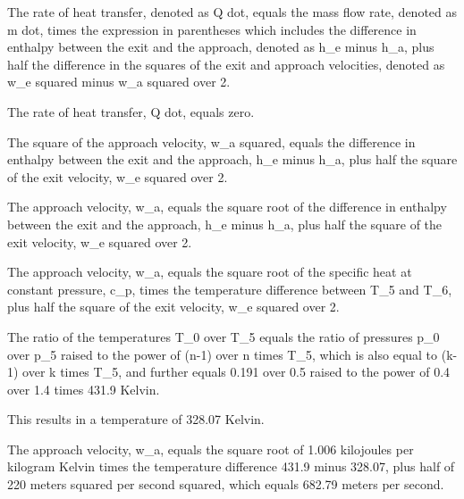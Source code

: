 The rate of heat transfer, denoted as Q dot, equals the mass flow rate, denoted as m dot, times the expression in parentheses which includes the difference in enthalpy between the exit and the approach, denoted as h_e minus h_a, plus half the difference in the squares of the exit and approach velocities, denoted as w_e squared minus w_a squared over 2.

The rate of heat transfer, Q dot, equals zero.

The square of the approach velocity, w_a squared, equals the difference in enthalpy between the exit and the approach, h_e minus h_a, plus half the square of the exit velocity, w_e squared over 2.

The approach velocity, w_a, equals the square root of the difference in enthalpy between the exit and the approach, h_e minus h_a, plus half the square of the exit velocity, w_e squared over 2.

The approach velocity, w_a, equals the square root of the specific heat at constant pressure, c_p, times the temperature difference between T_5 and T_6, plus half the square of the exit velocity, w_e squared over 2.

The ratio of the temperatures T_0 over T_5 equals the ratio of pressures p_0 over p_5 raised to the power of (n-1) over n times T_5, which is also equal to (k-1) over k times T_5, and further equals 0.191 over 0.5 raised to the power of 0.4 over 1.4 times 431.9 Kelvin.

This results in a temperature of 328.07 Kelvin.

The approach velocity, w_a, equals the square root of 1.006 kilojoules per kilogram Kelvin times the temperature difference 431.9 minus 328.07, plus half of 220 meters squared per second squared, which equals 682.79 meters per second.